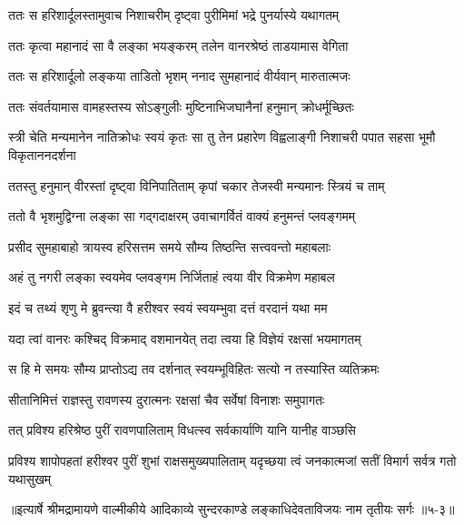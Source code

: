 \twolineshloka
{ततः स हरिशार्दूलस्तामुवाच निशाचरीम्}
{दृष्ट्वा पुरीमिमां भद्रे पुनर्यास्ये यथागतम्} %

\twolineshloka
{ततः कृत्वा महानादं सा वै लङ्का भयङ्करम्}
{तलेन वानरश्रेष्ठं ताडयामास वेगिता} %

\twolineshloka
{ततः स हरिशार्दूलो लङ्कया ताडितो भृशम्}
{ननाद सुमहानादं वीर्यवान् मारुतात्मजः} %

\twolineshloka
{ततः संवर्तयामास वामहस्तस्य सोऽङ्गुलीः}
{मुष्टिनाभिजघानैनां हनुमान् क्रोधर्मूच्छितः} %

\threelineshloka
{स्त्री चेति मन्यमानेन नातिक्रोधः स्वयं कृतः}
{सा तु तेन प्रहारेण विह्वलाङ्गी निशाचरी}
{पपात सहसा भूमौ विकृताननदर्शना} %

\twolineshloka
{ततस्तु हनुमान् वीरस्तां दृष्ट्वा विनिपातिताम्}
{कृपां चकार तेजस्वी मन्यमानः स्त्रियं च ताम्} %

\twolineshloka
{ततो वै भृशमुद्विग्ना लङ्का सा गद्गदाक्षरम्}
{उवाचागर्वितं वाक्यं हनुमन्तं प्लवङ्गमम्} %

\twolineshloka
{प्रसीद सुमहाबाहो त्रायस्व हरिसत्तम}
{समये सौम्य तिष्ठन्ति सत्त्ववन्तो महाबलाः} %

\twolineshloka
{अहं तु नगरी लङ्का स्वयमेव प्लवङ्गम}
{निर्जिताहं त्वया वीर विक्रमेण महाबल} %

\twolineshloka
{इदं च तथ्यं शृणु मे ब्रुवन्त्या वै हरीश्वर}
{स्वयं स्वयम्भुवा दत्तं वरदानं यथा मम} %

\twolineshloka
{यदा त्वां वानरः कश्चिद् विक्रमाद् वशमानयेत्}
{तदा त्वया हि विज्ञेयं रक्षसां भयमागतम्} %

\twolineshloka
{स हि मे समयः सौम्य प्राप्तोऽद्य तव दर्शनात्}
{स्वयम्भूविहितः सत्यो न तस्यास्ति व्यतिक्रमः} %

\twolineshloka
{सीतानिमित्तं राज्ञस्तु रावणस्य दुरात्मनः}
{रक्षसां चैव सर्वेषां विनाशः समुपागतः} %

\twolineshloka
{तत् प्रविश्य हरिश्रेष्ठ पुरीं रावणपालिताम्}
{विधत्स्व सर्वकार्याणि यानि यानीह वाञ्छसि} %

\twolineshloka
{प्रविश्य शापोपहतां हरीश्वर पुरीं शुभां राक्षसमुख्यपालिताम्}
{यदृच्छया त्वं जनकात्मजां सतीं विमार्ग सर्वत्र गतो यथासुखम्} %


॥इत्यार्षे श्रीमद्रामायणे वाल्मीकीये आदिकाव्ये सुन्दरकाण्डे लङ्काधिदेवताविजयः नाम तृतीयः सर्गः ॥५-३॥

